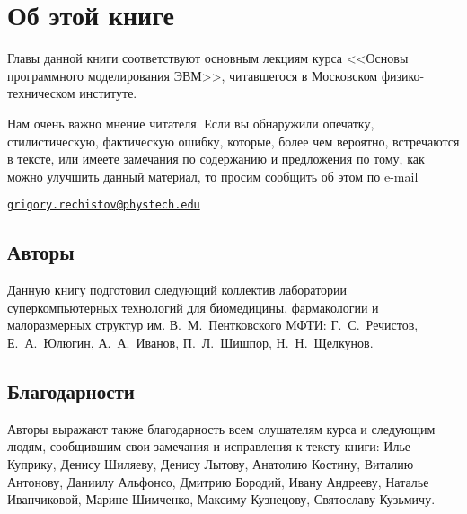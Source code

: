 \chapter*{Об этой книге}\label{chap:contrib}

Главы данной книги соответствуют основным лекциям курса <<Основы программного моделирования ЭВМ>>, читавшегося в Московском физико-техническом институте.

Нам очень важно мнение читателя. Если вы обнаружили опечатку, стилистическую, фактическую ошибку, которые, более чем вероятно, встречаются в тексте, или имеете замечания по содержанию и предложения по тому, как можно улучшить данный материал, то просим сообщить об этом по e-mail 

\begin{center}
\href{mailto:grigory.rechistov@phystech.edu}{\texttt{grigory.rechistov@phystech.edu}}
\end{center}


\section*{Авторы}

Данную книгу подготовил следующий коллектив лаборатории суперкомпьютерных технологий для биомедицины, фармакологии и малоразмерных структур им. В.~М.~Пентковского МФТИ: Г.~С.~Речистов, Е.~А.~Юлюгин, А.~А.~Иванов, П.~Л.~Шишпор, Н.~Н.~Щелкунов.

\iftoggle{webpaper}{
    Актуальная версия данного текста доступна в Интернет по адресу
    
    \url{http://iscalare.mipt.ru/materials/course_materials/}.
}{} %

\section*{Благодарности}

Авторы выражают также благодарность всем слушателям курса и следующим людям, сообщившим свои замечания и исправления к тексту книги: Илье Куприку, Денису Шиляеву, Денису Лытову, Анатолию Костину, Виталию Антонову, Даниилу Альфонсо, Дмитрию Бородий, Ивану Андрееву, Наталье Иванчиковой, Марине Шимченко, Максиму Кузнецову, Святославу Кузьмичу.
